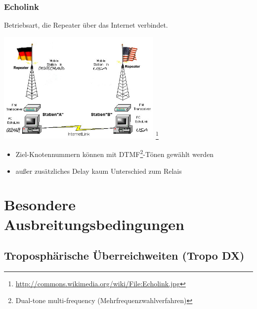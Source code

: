 \begin{frame}
    \frametitle{Echolink}

    Betriebsart, die Repeater über das Internet verbindet.

    \begin{center}
        \includegraphics[width=0.6\textwidth]{bv11/Echolink.jpg}
        \footnote{\tiny \url{http://commons.wikimedia.org/wiki/File:Echolink.jpg}}
    \end{center}

    \begin{itemize}
        \item Ziel-Knotennummern können mit DTMF\footnote{Dual-tone multi-frequency
              (Mehrfrequenzwahlverfahren)}-Tönen gewählt werden
        \item außer zusätzliches Delay kaum Unterschied zum Relais
    \end{itemize}

\end{frame}

\section[Ausbreitungsbed.]{Besondere Ausbreitungsbedingungen}

\subsection[Tropo DX]{Troposphärische Überreichweiten (Tropo DX)}

